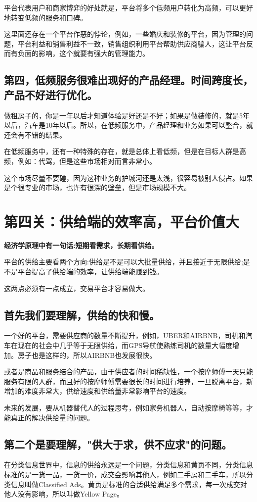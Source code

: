 \documentclass[12pt]{article}
\begin{document}
平台代表用户和商家博弈的好处就是，平台将多个低频用户转化为高频，可以更好地转变低频的服务和口碑。

这里面还存在一个平台作恶的悖论，例如，一些婚庆和装修的平台，因为管理的问题，平台利益和销售利益不一致，销售组织利用平台帮助供应商骗人，这让平台反而有负面的影响，这个就要有强大的管理能力。

\subsection{第四，低频服务很难出现好的产品经理。时间跨度长，产品不好进行优化。}
做租房子的，你是一年以后才知道体验是好还是不好；如果是做装修的，就是5年以后，汽车是10年以后。所以，在低频服务中，产品经理和业务如果可以整合，就还会有不错的结果。

在低频服务中，还有一种特殊的存在，就是总体上看低频，但是在目标人群是高频，例如：代驾，但是这些市场相对而言非常小。

这个市场尽量不要碰，因为这种业务的护城河还是太浅，很容易被别人侵占。如果是个很专业的市场，也许有很深的壁垒，但是市场规模不大。

\section{第四关：供给端的效率高，平台价值大}
\textbf{经济学原理中有一句话:短期看需求，长期看供给。}

平台的供给主要看两个方向:供给是不是可以大批量供给，并且接近于无限供给;是不是平台提高了供给端的效率，让供给端能赚到钱。

这两点必须有一点成立，交易平台才容易做大。

\subsection{首先我们要理解，供给的快和慢。}
一个好的平台，需要供应商的数量不断提升，例如，UBER和AIRBNB，司机和汽车在现在的社会中几乎等于无限供给，而GPS导航使熟练司机的数量大幅度增加。房子也是这样的，所以AIRBNB也发展很快。

或者是商品和服务结合的产品，由于供应者的时间稀缺性，一个按摩师傅一天只能服务有限的人群，而且好的按摩师傅需要很长的时间进行培养，一旦脱离平台，新增加的难度非常大，供给速度和供给量非常影响平台的速度。

未来的发展，要从机器替代人的过程思考，例如家务机器人，自动按摩椅等等，才能真正的解决供给量的问题。

\subsection{第二个是要理解，"供大于求，供不应求"的问题。}
在分类信息世界中，信息的供给永远是一个问题，分类信息和黄页不同，分类信息标准的是一货一品，一货一价，成交会影响其他人，例如二手房和二手车，所以分类信息叫做Classified Ads。黄页是标准的合适供给满足多个需求，每一次成交对他人没有影响，所以叫做Yellow Page。
\end{document}
